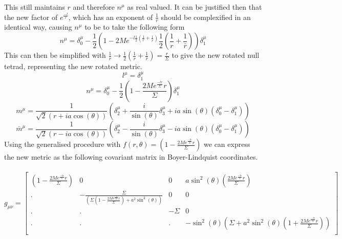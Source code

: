 \documentclass[12pt]{iopart}
\begin{document}
 This still maintains $r$ and therefore $n^{\mu}$ as real valued. It can be justified then that the new factor of $e^{\frac{-l}{r}}$, which has an exponent of $\frac{1}{r}$ should be complexified in an identical way, causing $n^{\mu}$ to be to take the following form
 \\
 \begin{equation} 
 n^{\mu}=\delta^{\mu}_0-\frac{1}{2}\left(1-2Me^{-l\frac{1}{2}\left(\frac{1}{r}+\frac{1}{\bar{r}}\right)}\frac{1}{2}\left(\frac{1}{r}+\frac{1}{\bar{r}}\right)\right)\delta^{\mu}_1
 \end{equation}
 This can then be simplified with $\frac{1}{r} \rightarrow \frac{1}{2}\left(\frac{1}{r}+\frac{1}{\bar{r}}\right) = \frac{r}{\Sigma}$ to give the new rotated null tetrad, representing the new rotated metric. 
 \begin{equation} 
 l^{\mu}=\delta^{\mu}_1
 \end{equation}
 \begin{equation} 
 n^{\mu}=\delta^{\mu}_0-\frac{1}{2}\left(1-\frac{2Me^{\frac{-lr}{\Sigma}}r}{\Sigma}\right)\delta^{\mu}_1
 \end{equation}
 \begin{equation}
 m^{\mu}=\frac{1}{\sqrt{2}(r+ia\cos(\theta))}\left(\delta^{\mu}_2+\frac{i}{\sin(\theta)}\delta^{\mu}_3+ia\sin(\theta)(\delta^{\mu}_0-\delta^{\mu}_1)\right)
 \end{equation}
 \begin{equation}
 \bar{m}^{\mu}=\frac{1}{\sqrt{2}(r-ia\cos(\theta))}\left(\delta^{\mu}_2-\frac{i}{\sin(\theta)}\delta^{\mu}_3-ia\sin(\theta)(\delta^{\mu}_0-\delta^{\mu}_1)\right)
 \end{equation}
Using the generalised procedure with $f(r,\theta ) = \left(1-\frac{2Me^{\frac{-lr}{\Sigma}}r}{\Sigma}\right)$ we can express the new metric as the following covariant matrix in Boyer-Lindquist coordinates.
\\
\\
\[
g_{\mu \nu}=
  \left[ {\begin{array}{ccccc}
 \left(1-\frac{2Me^{\frac{-lr}{\Sigma}}r}{\Sigma}\right) & 0 & 0 & a\sin^2(\theta)\left(\frac{2Me^{\frac{-lr}{\Sigma}}r}{\Sigma}\right)\\
 . & -\frac{\Sigma}{\left(\Sigma \left(1-\frac{2Me^{\frac{-lr}{\Sigma}}r}{\Sigma}\right)+a^2\sin^2(\theta)\right)} & 0 & 0\\
 . & . & -\Sigma & 0\\
 . & . & . & -\sin^2(\theta)\left(\Sigma+a^2\sin^2(\theta)\left(1+\frac{2Me^{\frac{-lr}{\Sigma}}r}{\Sigma}\right)\right)\\
  \end{array} } \right]
\]
\end{document}
